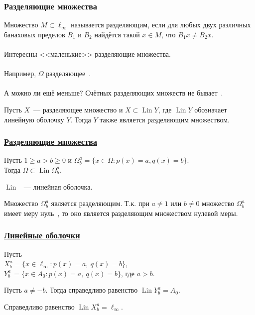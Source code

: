 \begin{frame}\frametitle{Разделяющие множества}
	Множество $M\subset \ell_\infty$ называется разделяющим,
	если для любых двух различных банаховых пределов $B_1$ и $B_2$
	найдётся такой $x\in M$, что $B_1 x \ne B_2 x$.
	\\~\\
	Интересны <<маленькие>> разделяющие множества.
	\\~\\
	Например, $\Omega$ разделяющее~\cite{semenov2010characteristic}.
	\\~\\
	А можно ли ещё меньше?
	\vfill
	Счётных разделяющих множеств не бывает~\cite[{следствие 22}]{Semenov2014geomprops}.
	\vfill
	\begin{llemma}
		Пусть $X$~--- разделяющее множество и $X \subset \operatorname{Lin} Y$,
		где $\operatorname{Lin} Y$ обозначает линейную оболочку $Y$.
		Тогда $Y$ также является разделяющим множеством.
	\end{llemma}
\end{frame}


\begin{frame}\frametitle{\underline{Разделяющие множества}}

	\begin{ttheorem}
		Пусть
		$1 \geq a > b \geq 0$ и
		$\Omega^a_b = \{x\in\Omega : p(x) = a, q(x) = b\}$.
		\\
		Тогда $\Omega \subset \operatorname{Lin} \Omega^a_b$.
	\end{ttheorem}

	\vfill
	$\operatorname{Lin}$ ~--- линейная оболочка.
	\vfill
	\begin{ttheorem}
		Множество $\Omega^a_b$ является разделяющим.
		Т.к. при $a\neq 1$ или $b\neq 0$ множество $\Omega^a_b$ имеет меру нуль~\cite{semenov2010characteristic,connor1990almost},
		то оно является разделяющим множеством нулевой меры.
	\end{ttheorem}
\end{frame}


\begin{frame}\frametitle{\underline{Линейные оболочки}}

	Пусть
	\\
	$X^a_b = \{x\in\ell_\infty : p(x) = a,~ q(x) = b\}$,
	\\
	$Y^a_b\, = \{x\in A_0 : p(x) = a,~ q(x) = b\}$, где $a>b$.
	\vfill
	\begin{ttheorem}
		Пусть $a\neq -b$.
		Тогда справедливо равенство $\operatorname{Lin} Y^a_b = A_0$.
	\end{ttheorem}
	\vfill
	\begin{ttheorem}
		Справедливо равенство $\operatorname{Lin} X^a_b = \ell_\infty$.
	\end{ttheorem}

\end{frame}



